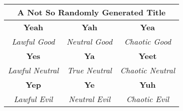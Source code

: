 \documentclass[a11paper, 11pt]{article}
\begin{document}
\begin{table}[h!]
\begin{tabular}{ccc}
\multicolumn{3}{c}{A Not So Randomly Generated Title} \\ \hline
\multicolumn{1}{c|}{\textbf{Yeah}} &
  \multicolumn{1}{c|}{\textbf{Yah}} &
  \textbf{Yea} \\ \hline
\multicolumn{1}{c|}{{\color[HTML]{656565} \textit{Lawful Good}}} &
  \multicolumn{1}{c|}{{\color[HTML]{656565} \textit{Neutral Good}}} &
  {\color[HTML]{656565} \textit{Chaotic Good}} \\ \hline
\multicolumn{1}{c|}{\textbf{Yes}} &
  \multicolumn{1}{c|}{\textbf{Ya}} &
  \textbf{Yeet} \\ \hline
\multicolumn{1}{c|}{{\color[HTML]{656565} \textit{Lawful Neutral}}} &
  \multicolumn{1}{c|}{{\color[HTML]{656565} \textit{True Neutral}}} &
  {\color[HTML]{656565} \textit{Chaotic Neutral}} \\ \hline
\multicolumn{1}{c|}{\textbf{Yep}} &
  \multicolumn{1}{c|}{\textbf{Ye}} &
  \textbf{Yuh} \\ \hline
\multicolumn{1}{c|}{{\color[HTML]{656565} \textit{Lawful Evil}}} &
  \multicolumn{1}{c|}{{\color[HTML]{656565} \textit{Neutral Evil}}} &
  {\color[HTML]{656565} \textit{Chaotic Evil}}
\end{tabular}
\end{table}





\end{document}
